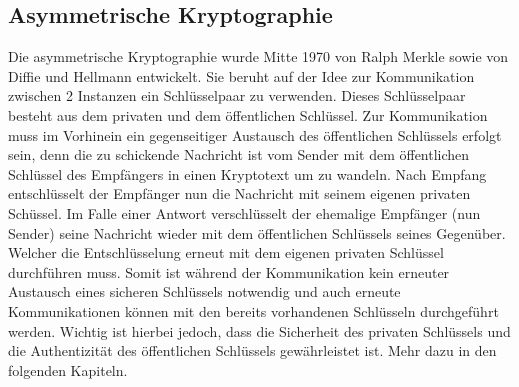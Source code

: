 \documentclass[paper=a4,11pt,german]{scrartcl} %
\begin{document}
\subsection{Asymmetrische Kryptographie}
Die asymmetrische Kryptographie wurde Mitte 1970 von Ralph Merkle sowie von Diffie und Hellmann entwickelt. Sie beruht auf der Idee zur Kommunikation zwischen 2 Instanzen ein Schlüsselpaar zu verwenden. Dieses Schlüsselpaar besteht aus dem privaten und dem öffentlichen Schlüssel. Zur Kommunikation muss im Vorhinein ein gegenseitiger Austausch des öffentlichen Schlüssels erfolgt sein, denn die zu schickende Nachricht ist vom Sender mit dem öffentlichen Schlüssel des Empfängers in einen Kryptotext um zu wandeln. Nach Empfang entschlüsselt der Empfänger nun die Nachricht mit seinem eigenen privaten Schüssel. Im Falle einer Antwort verschlüsselt der ehemalige Empfänger (nun Sender) seine Nachricht wieder mit dem öffentlichen Schlüssels seines Gegenüber. Welcher die Entschlüsselung erneut mit dem eigenen privaten Schlüssel durchführen muss. Somit ist während der Kommunikation kein erneuter Austausch eines sicheren Schlüssels notwendig und auch erneute Kommunikationen können mit den bereits vorhandenen Schlüsseln durchgeführt werden. Wichtig ist hierbei jedoch, dass die Sicherheit des privaten Schlüssels und die Authentizität des öffentlichen Schlüssels gewährleistet ist. Mehr dazu in den folgenden Kapiteln.
\newpage
\end{document}
